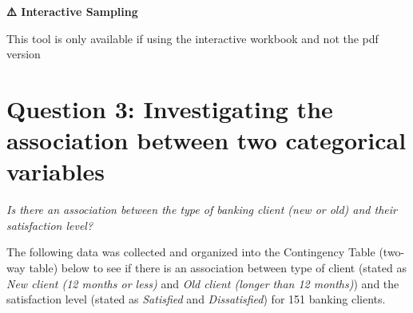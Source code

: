 \documentclass[
  11pt,
  oneside]{scrbook}
\begin{document}
\begin{warningbox}
\textbf{⚠️ Interactive Sampling}

This tool is only available if using the interactive workbook and not the pdf version
\end{warningbox}

\section{Question 3: Investigating the association between two categorical variables}\label{question-3-investigating-the-association-between-two-categorical-variables}

\emph{Is there an association between the type of banking client (new or old) and their satisfaction level?}

The following data was collected and organized into the Contingency Table (two-way table) below to see if there is an association between type of client (stated as \emph{New client (12 months or less)} and \emph{Old client (longer than 12 months)}) and the satisfaction level (stated as \emph{Satisfied} and \emph{Dissatisfied}) for 151 banking clients.
\end{document}
